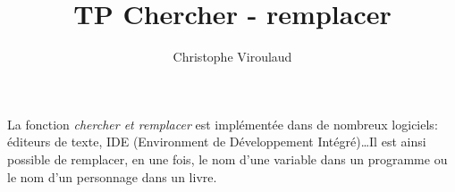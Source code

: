 \documentclass[svgnames,11pt]{beamer}
\author[]{Christophe Viroulaud}
\title{TP Chercher - remplacer}
\date{\framebox{\textbf{Algo 28}}}
\institute{Terminale - NSI}
\begin{document}
\begin{frame}
\titlepage
{}
\end{frame}

\begin{frame}

    La fonction \emph{chercher et remplacer} est implémentée dans de nombreux logiciels: éditeurs de texte, IDE (Environment de Développement Intégré)\dots Il est ainsi possible de remplacer, en une fois, le nom d'une variable dans un programme ou le nom d'un personnage dans un livre.

    \begin{center}
    \end{center}

\end{frame}
\end{document}
